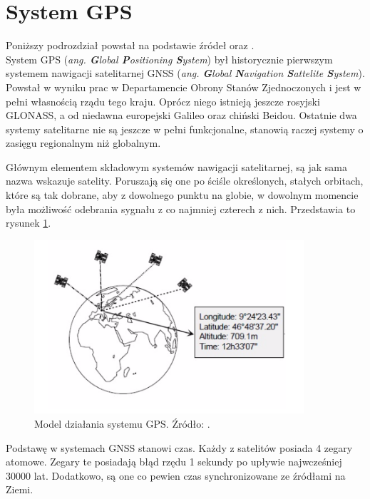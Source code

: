 \section{System GPS}
\label{GPS}

Poniższy podrozdział powstał na podstawie źródeł \cite{GPS_ublox} oraz \cite{inzynierka}.\\



System GPS (\textit{ang. \textbf{G}lobal \textbf{P}ositioning \textbf{S}ystem}) był historycznie pierwszym systemem nawigacji satelitarnej GNSS (\textit{ang. \textbf{G}lobal \textbf{N}avigation \textbf{S}attelite \textbf{S}ystem}). Powstał w wyniku prac w Departamencie Obrony Stanów Zjednoczonych i jest w pełni własnością rządu tego kraju. Oprócz niego istnieją jeszcze rosyjski GLONASS, a od niedawna europejski Galileo oraz chiński Beidou. Ostatnie dwa systemy satelitarne nie są jeszcze w pełni funkcjonalne, stanowią raczej systemy o zasięgu regionalnym niż globalnym.

Głównym elementem składowym systemów nawigacji satelitarnej, są jak sama nazwa wskazuje satelity. Poruszają się one po ściśle określonych, stałych orbitach, które są tak dobrane, aby z dowolnego punktu na globie, w dowolnym momencie była możliwość odebrania sygnału z co najmniej czterech z nich. Przedstawia to rysunek \ref{fig:image_gps_basics}.

\begin{figure}[H]
	\centering
	\includegraphics[width=10cm]{img/theory/GPS/gps_introduction.png}
	\caption{Model działania systemu GPS. Źródło: \cite{GPS_ublox}.}
	\label{fig:image_gps_basics}
\end{figure}

Podstawę w systemach GNSS stanowi czas. Każdy z satelitów posiada 4 zegary atomowe. Zegary te posiadają błąd rzędu 1 sekundy po upływie najwcześniej 30000 lat. Dodatkowo, są one co pewien czas synchronizowane ze źródłami na Ziemi.

